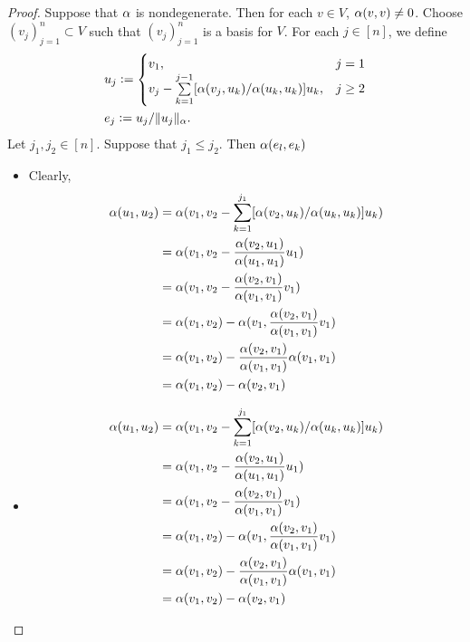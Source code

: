 \documentclass{book}
\begin{document}
	\begin{proof}
		Suppose that $\alpha$ is nondegenerate. Then for each $v \in V$, $\alpha(v,v) \neq 0$. Choose $(v_j)_{j=1}^n \subset V$ such that $(v_j)_{j=1}^n$ is a basis for $V$. For each $j \in [n]$, we define 
		\begin{align*}
			& u_j \vcentcolon=
			\begin{cases}
				v_1, & j = 1 \\
				v_j - \sum\limits_{k=1}^{j-1} [\alpha(v_j, u_k)/\alpha(u_k, u_k)] u_k, & j \geq 2
			\end{cases} \\
		& e_j \vcentcolon= u_j/ \|u_j\|_{\alpha}.
		\end{align*}
		Let $j_1, j_2 \in [n]$. Suppose that $j_1 \leq j_2$. Then  
		$\alpha(e_l, e_k)$
		\begin{itemize}
			\item Clearly, 
			\begin{align*}
				\alpha(u_1, u_2 ) 
				& = \alpha( v_1, v_2 - \sum_{k=1}^{j_1} [\alpha(v_2, u_k)/\alpha(u_k, u_k)] u_k ) \\
				& = \alpha( v_1, v_2 - \frac{\alpha(v_2, u_1)}{\alpha(u_1, u_1)} u_1  ) \\
				& = \alpha( v_1, v_2 - \frac{\alpha(v_2, v_1)}{\alpha(v_1, v_1)} v_1  ) \\
				& = \alpha( v_1, v_2 )  - \alpha( v_1, \frac{\alpha(v_2, v_1)}{\alpha(v_1, v_1)} v_1 ) \\
				& = \alpha( v_1, v_2 )  -  \frac{\alpha(v_2, v_1)}{\alpha(v_1, v_1)} \alpha( v_1, v_1 ) \\
				& = \alpha( v_1, v_2 )  -  \alpha(v_2, v_1) \\
			\end{align*}
			\item \begin{align*}
				\alpha(u_1, u_2 ) 
				& = \alpha( v_1, v_2 - \sum_{k=1}^{j_1} [\alpha(v_2, u_k)/\alpha(u_k, u_k)] u_k ) \\
				& = \alpha( v_1, v_2 - \frac{\alpha(v_2, u_1)}{\alpha(u_1, u_1)} u_1  ) \\
				& = \alpha( v_1, v_2 - \frac{\alpha(v_2, v_1)}{\alpha(v_1, v_1)} v_1  ) \\
				& = \alpha( v_1, v_2 )  - \alpha( v_1, \frac{\alpha(v_2, v_1)}{\alpha(v_1, v_1)} v_1 ) \\
				& = \alpha( v_1, v_2 )  -  \frac{\alpha(v_2, v_1)}{\alpha(v_1, v_1)} \alpha( v_1, v_1 ) \\
				& = \alpha( v_1, v_2 )  -  \alpha(v_2, v_1) \\
			\end{align*}
		\end{itemize}
	\end{proof}
\end{document}
